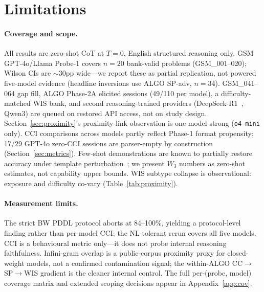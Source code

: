 \documentclass{article}
\newcommand{\omini}{\texttt{o4-mini}}     %
\newcommand{\wthree}{\ensuremath{W_3}}
\begin{document}
\section*{Limitations}
\label{sec:limitations}

\paragraph{Coverage and scope.}
All results are zero-shot CoT at $T{=}0$, English structured reasoning only.
GSM GPT-4o/Llama Probe-1 covers $n{=}20$ bank-valid problems
(GSM\_001--020); Wilson CIs are $\sim$30pp wide---we report these as partial
replication, not powered five-model evidence (headline inversions use ALGO
SP-adv, $n{=}34$). GSM\_041--064 gap fill, ALGO Phase-2A elicited sessions
(49/110 per model), a difficulty-matched WIS bank, and second
reasoning-trained providers (DeepSeek-R1~\citep{guo2025deepseek},
Qwen3) are queued on restored API access, not on study design.
Section~\ref{sec:proximity}'s proximity-link observation is
one-model-strong (\omini{} only). CCI comparisons across models partly
reflect Phase-1 format propensity; 17/29 GPT-4o zero-CCI sessions are
parser-empty by construction (Section~\ref{sec:metrics}). Few-shot
demonstrations are known to partially restore accuracy under template
perturbation~\citep{mirzadeh2024gsm}; we present \wthree{} numbers as
zero-shot estimates, not capability upper bounds. WIS subtype collapse is
observational: exposure and difficulty co-vary (Table~\ref{tab:proximity}).

\paragraph{Measurement limits.}
The strict BW PDDL protocol aborts at 84--100\%, yielding a protocol-level
finding rather than per-model CCI; the NL-tolerant rerun covers all five
models. CCI is a behavioural metric only---it does not probe internal
reasoning faithfulness. Infini-gram overlap is a public-corpus proximity
proxy for closed-weight models, not a confirmed contamination signal; the
within-ALGO CC$\to$SP$\to$WIS gradient is the cleaner internal control. The
full per-(probe, model) coverage matrix and extended scoping decisions
appear in Appendix~\ref{app:cov}.



\appendix

\end{document}
